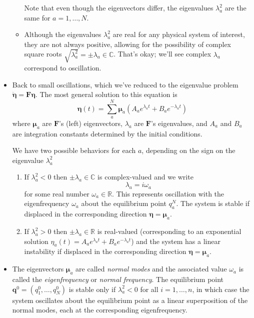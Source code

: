 \documentclass[11pt, a4paper]{article}
\newcommand{\R}{\mathbb{R}} %
\newcommand{\mat}[1]{\mathbf{#1}} %
\begin{document}
\begin{itemize}
\begin{itemize}
		Note that even though the eigenvectors differ, the eigenvalues $ \lambda_{a}^{2} $ are the same for $ a = 1, \ldots, N $.
		
		\item Although the eigenvalues $ \lambda_{a}^{2} $ are real for any physical system of interest, they are not always positive, allowing for the possibility of complex square roots $ \sqrt{\lambda_{a}^{2}} = \pm \lambda_{a} \in \mathbb{C} $. That's okay; we'll see complex $  \lambda_{a}  $ correspond to oscillation.

	\end{itemize}

	\item Back to small oscillations, which we've reduced to the eigenvalue problem $ \ddot{\bm{\eta}} = \mathbf{F} \bm{\eta} $. The most general solution to this equation is
	\begin{equation*}
		\bm{\eta}(t) = \sum_{a}^{N} \bm{\mu}_{a} \left(A_a e^{\lambda_a t} + B_a e^{ -\lambda_a t} \right)
	\end{equation*}
	where $ \bm{\mu}_{a} $ are $ \mat{F} $'s (left) eigenvectors, $ \lambda_{a} $  are $ \mat{F} $'s eigenvalues, and $ A_a $ and $ B_a $ are integration constants determined by the initial conditions. 
	
	We have two possible behaviors for each $ a $, depending on the sign on the eigenvalue $ \lambda_{a}^{2} $
	\begin{enumerate}
		\item If $ \lambda_a^2 < 0 $ then $ \pm \lambda_a \in \mathbb{C} $ is complex-valued and we write 
		\begin{equation*}
			\lambda_a = i \omega_a
		\end{equation*}
		for some real number $ \omega_a \in \R $. This represents oscillation with the eigenfrequency $ \omega_a $ about the equilibrium point $ q_{a}^{N} $. The system is stable if displaced in the corresponding direction $ \bm{\eta} = \bm{\mu}_a $.
		
		\item If $ \lambda_a^2 > 0 $ then $ \pm \lambda_a \in \R $ is real-valued (corresponding to an exponential solution $ \eta_{a}(t) = A_{a} e^{\lambda_{a} t} +  B_{a} e^{- \lambda_{a} t} $)  and the system has a linear instability if displaced in the corresponding direction $ \bm{\eta} = \bm{\mu}_a $.
	\end{enumerate}
	
	\item The eigenvectors $ \bm{\mu}_{a} $ are called \textit{normal modes} and the associated value $ \omega_{a} $ is called the \textit{eigenfrequency} or \textit{normal frequency}. The equilibrium point $ \bm{q}^{0} = (q_{1}^{0}, \ldots, q_{N}^{0}) $ is stable only if $ \lambda_{a}^{2} < 0 $ for all $ i = 1, \dots, n $, in which case the system oscillates about the equilibrium point as a linear superposition of the normal modes, each at the corresponding eigenfrequency.
	

\end{itemize}
\end{document}
